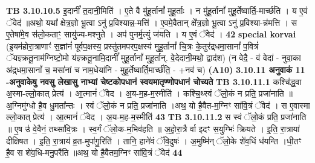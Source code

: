 \documentclass[17pt]{extarticle}
\begin{document}
{{{{{{{{{{{{{{{{{{{{{{                  \newline
                                \textbf{ TB 3.10.10.5} \newline
                  इ॒दानीं᳚ त॒दानी॒मिति॑ । ए॒ते वै मु॑हू॒र्तानां᳚ मुहू॒र्ताः । न मु॑हू॒र्तानां᳚ मुहू॒र्तेष्वार्ति॒-मार्च्छ॑ति । य ए॒वं ॅवेद॑ ॥अथो॒ यथा᳚ क्षेत्र॒ज्ञो भू॒त्वा ऽनु॑ प्र॒विश्यान्न॒-मत्ति॑ । ए॒वमे॒वैतान् क्षे᳚त्र॒ज्ञो भू॒त्वा ऽनु॑ प्र॒विश्या-न्न॑मत्ति । स ए॒तेषा॑मे॒व स॑लो॒कताꣳ॒॒ सायु॑ज्य-मश्नुते । अप॑ पुनर्मृ॒त्युं ज॑यति । य ए॒वं ॅवेद॑ । \textbf{ 42} \newline
                  \newline
                                                        \textbf{special korvai} \newline
              (इ॒यम॑होरा॒त्राणाꣳ॑ स॒ज्ञांनं॑ पूर्वप॒क्षस्य॒ प्रस्तु॑तमपरप॒क्षस्य॑ मुहू॒र्तानां᳚ चि॒त्रः के॒तुर॑द्र्धमा॒सानां᳚ प॒वित्रं॑ ॅयज्ञ्क्रतू॒नाम॑ग्निष्टो॒मो य॑ज्ञ्क्रतू॒नामि॒दानीं᳚ मुहू॒र्तानां᳚ मुहू॒र्तान्. वे॒देदानी॒मथो॒ द्वाद॑श) \newline
                                (न वेदै॒ - वं वेदा॑ - नुवा॒का अ॑द्र्धमा॒सानां᳚ च॒ मसा॑नां च नाम॒धेया॑नि - मुहू॒र्तेष्वार्ति॒मार्च्छ॑ति॒ - +नव॑ च) \textbf{(A10)} \newline \newline
                \textbf{ 3.10.11   अनुवाकं   11 -अनुवाकेषु नवसु लेखासु नाभ्यां चेष्टकोपधानं स्वयमातृण्णोपधानं चोच्यते} \newline
                                \textbf{ TB 3.10.11.1} \newline
                  कश्चि॑द्ध॒वा अ॒स्मा-ल्लो॒कात् प्रेत्य॑ । आ॒त्मानं॑ ॅवेद । अ॒य-म॒ह-म॒स्मीति॑ । कश्चि॒थ्स्वं ॅलो॒कं न प्रति॒ प्रजा॑नाति ॥ अ॒ग्निमु॑ग्धो है॒व धु॒मता᳚न्तः । स्वं ॅलो॒कं न प्रति॒ प्रजा॑नाति ।अथ॒ यो है॒वैत-म॒ग्निꣳ सा॑वि॒त्रं ॅवेद॑ । स ए॒वास्मा ल्लो॒कात् प्रेत्य॑ । आ॒त्मानं॑ ॅवेद । अ॒य-म॒ह-म॒स्मीति॑ \textbf{ 43} \newline
                  \newline
                                \textbf{ TB 3.10.11.2} \newline
                  स स्वं ॅलो॒कं प्रति॒ प्रजा॑नाति ॥ ए॒ष उ॑ वे॒वैनं॒ तथ्सा॑वि॒त्रः । स्व॒र्गं ॅलो॒क-म॒भिव॑हति ॥ अ॒हो॒रा॒त्रै र्वा इदꣳ स॒युग्भिः॑ क्रियते । इ॒ति॒ रा॒त्राया॑ दीक्षिषत । इ॒ति॒ रा॒त्राय॑ व्र॒त-मुपा॑गु॒रिति॑ । तानि॒ हाने॑वं ॅवि॒दुषः॑ । अ॒मुष्मि॑न् ॅलो॒के शे॑व॒धिं ध॑यन्ति ।धी॒तꣳ है॒व स शे॑व॒धि-मनु॒परै॑ति ॥अथ॒ यो है॒वैतम॒ग्निꣳ सा॑वि॒त्रं ॅवेद॑ \textbf{ 44} \newline
                  \newline
}}}}}}}}}}}}}}}}}}}}}}
\end{document}
